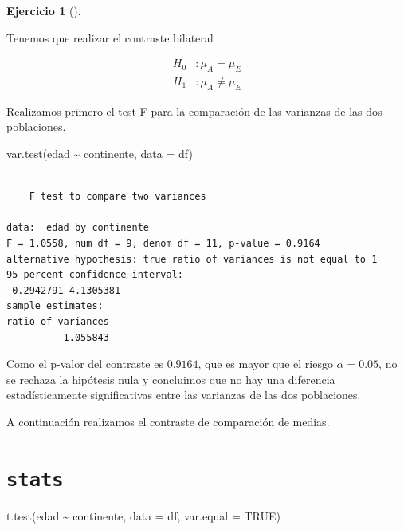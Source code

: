 \documentclass[
  a4paper,
]{scrreport}
\newenvironment{Shaded}{\begin{snugshade}}{\end{snugshade}}
\newcommand{\AttributeTok}[1]{\textcolor[rgb]{0.40,0.45,0.13}{#1}}
\newcommand{\ConstantTok}[1]{\textcolor[rgb]{0.56,0.35,0.01}{#1}}
\newcommand{\FunctionTok}[1]{\textcolor[rgb]{0.28,0.35,0.67}{#1}}
\newcommand{\NormalTok}[1]{\textcolor[rgb]{0.00,0.23,0.31}{#1}}
\newcommand{\SpecialCharTok}[1]{\textcolor[rgb]{0.37,0.37,0.37}{#1}}
\theoremstyle{definition}
\newtheorem{exercise}{Ejercicio}[chapter]
\theoremstyle{remark}
\begin{document}
\begin{exercise}[]
\begin{enumerate}
\begin{tcolorbox}
  Tenemos que realizar el contraste bilateral

  \begin{align*}
  H_0 &: \mu_A = \mu_E \\
  H_1 &: \mu_A \neq \mu_E 
  \end{align*}

  Realizamos primero el test F para la comparación de las varianzas de
  las dos poblaciones.

\begin{Shaded}
\begin{Highlighting}[]
\FunctionTok{var.test}\NormalTok{(edad }\SpecialCharTok{\textasciitilde{}}\NormalTok{ continente, }\AttributeTok{data =}\NormalTok{ df)}
\end{Highlighting}
\end{Shaded}

\begin{verbatim}

    F test to compare two variances

data:  edad by continente
F = 1.0558, num df = 9, denom df = 11, p-value = 0.9164
alternative hypothesis: true ratio of variances is not equal to 1
95 percent confidence interval:
 0.2942791 4.1305381
sample estimates:
ratio of variances 
          1.055843 
\end{verbatim}

  Como el p-valor del contraste es \(0.9164\), que es mayor que el
  riesgo \(\alpha=0.05\), no se rechaza la hipótesis nula y concluimos
  que no hay una diferencia estadísticamente significativas entre las
  varianzas de las dos poblaciones.

  A continuación realizamos el contraste de comparación de medias.

  \section{\texorpdfstring{\texttt{stats}}{stats}}

\begin{Shaded}
\begin{Highlighting}[]
\FunctionTok{t.test}\NormalTok{(edad }\SpecialCharTok{\textasciitilde{}}\NormalTok{ continente, }\AttributeTok{data =}\NormalTok{ df, }\AttributeTok{var.equal =} \ConstantTok{TRUE}\NormalTok{)}
\end{Highlighting}
\end{Shaded}

\begin{verbatim}


\end{verbatim}
\end{tcolorbox}
\end{enumerate}
\end{exercise}
\end{document}
